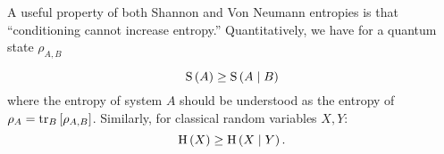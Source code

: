 A useful property of both Shannon and Von Neumann entropies is that ``conditioning cannot increase entropy.'' Quantitatively, we have for a quantum state $\rho_{A, B}$

\begin{equation}
\text{S}\left(A\right) \ge \text{S}\left( A \; \middle| \; B \right)
\end{equation}
where the entropy of system $A$ should be understood as the entropy of $\rho_A = \tr_B\left[\rho_{A, B}\right]$. Similarly, for classical random variables $X, Y$:
\begin{equation}
\text{H}\left(X\right) \ge \text{H}\left(X \; \middle| \; Y\right).
\end{equation}








